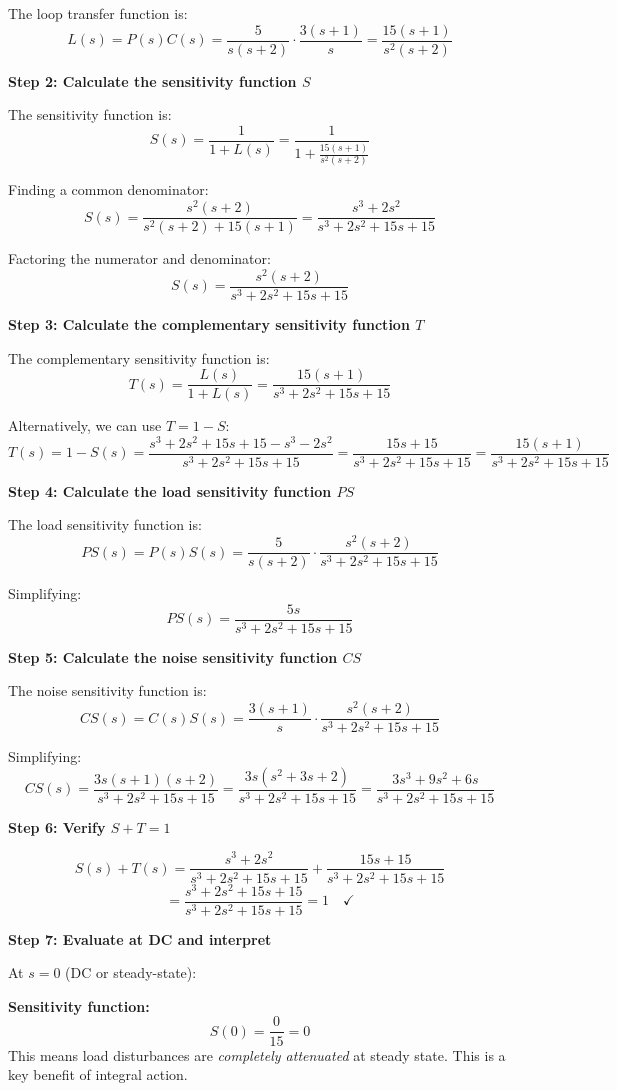 \documentclass[11pt,a4paper]{article}
\begin{document}
The loop transfer function is:
\[
L(s) = P(s)C(s) = \frac{5}{s(s+2)} \cdot \frac{3(s+1)}{s} = \frac{15(s+1)}{s^2(s+2)}
\]

\textbf{Step 2: Calculate the sensitivity function $S$}

The sensitivity function is:
\[
S(s) = \frac{1}{1 + L(s)} = \frac{1}{1 + \frac{15(s+1)}{s^2(s+2)}}
\]

Finding a common denominator:
\[
S(s) = \frac{s^2(s+2)}{s^2(s+2) + 15(s+1)} = \frac{s^3 + 2s^2}{s^3 + 2s^2 + 15s + 15}
\]

Factoring the numerator and denominator:
\[
S(s) = \frac{s^2(s+2)}{s^3 + 2s^2 + 15s + 15}
\]

\textbf{Step 3: Calculate the complementary sensitivity function $T$}

The complementary sensitivity function is:
\[
T(s) = \frac{L(s)}{1 + L(s)} = \frac{15(s+1)}{s^3 + 2s^2 + 15s + 15}
\]

Alternatively, we can use $T = 1 - S$:
\[
T(s) = 1 - S(s) = \frac{s^3 + 2s^2 + 15s + 15 - s^3 - 2s^2}{s^3 + 2s^2 + 15s + 15} = \frac{15s + 15}{s^3 + 2s^2 + 15s + 15} = \frac{15(s+1)}{s^3 + 2s^2 + 15s + 15}
\]

\textbf{Step 4: Calculate the load sensitivity function $PS$}

The load sensitivity function is:
\[
PS(s) = P(s)S(s) = \frac{5}{s(s+2)} \cdot \frac{s^2(s+2)}{s^3 + 2s^2 + 15s + 15}
\]

Simplifying:
\[
PS(s) = \frac{5s}{s^3 + 2s^2 + 15s + 15}
\]

\textbf{Step 5: Calculate the noise sensitivity function $CS$}

The noise sensitivity function is:
\[
CS(s) = C(s)S(s) = \frac{3(s+1)}{s} \cdot \frac{s^2(s+2)}{s^3 + 2s^2 + 15s + 15}
\]

Simplifying:
\[
CS(s) = \frac{3s(s+1)(s+2)}{s^3 + 2s^2 + 15s + 15} = \frac{3s(s^2+3s+2)}{s^3 + 2s^2 + 15s + 15} = \frac{3s^3 + 9s^2 + 6s}{s^3 + 2s^2 + 15s + 15}
\]

\textbf{Step 6: Verify $S + T = 1$}

\[
S(s) + T(s) = \frac{s^3 + 2s^2}{s^3 + 2s^2 + 15s + 15} + \frac{15s + 15}{s^3 + 2s^2 + 15s + 15}
\]
\[
= \frac{s^3 + 2s^2 + 15s + 15}{s^3 + 2s^2 + 15s + 15} = 1 \quad \checkmark
\]

\textbf{Step 7: Evaluate at DC and interpret}

At $s = 0$ (DC or steady-state):

\textbf{Sensitivity function:}
\[
S(0) = \frac{0}{15} = 0
\]
This means load disturbances are \emph{completely attenuated} at steady state. This is a key benefit of integral action.
\end{document}

